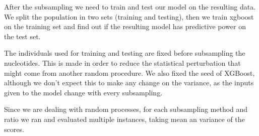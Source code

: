 After the subsampling we need to train and test our model on the resulting data. 
We split the population in two sets (training and testing), then we train xgboost on the training set and find out if the resulting model has predictive power on the test set.

The individuals used for training and testing are fixed before subsampling the nucleotides. This is made in order to reduce the statistical perturbation that might come from another random procedure.
We also fixed the seed of XGBoost, although we don't expect this to make any change on the variance, as the inputs given to the model change with every subsampling.

Since we are dealing with random processes, for each subsampling method and ratio we ran and evaluated multiple instances, taking mean an variance of the scores.